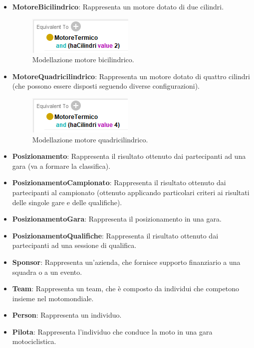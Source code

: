 \begin{itemize}
  \item \textbf{MotoreBicilindrico}: Rappresenta un motore dotato di due cilindri.
  \begin{figure}[H]
    \begin{center}
        \includegraphics[scale=1]{img/spec_bicilindrico.png}
       \caption{Modellazione motore bicilindrico.} 
    \end{center}
\end{figure}
  \item \textbf{MotoreQuadricilindrico}: Rappresenta un motore dotato di quattro cilindri (che possono essere disposti seguendo diverse configurazioni).
    \begin{figure}[H]
    \begin{center}
        \includegraphics[scale=1]{img/spec_quadricilindrico.png}
       \caption{Modellazione motore quadricilindrico.} 
    \end{center}
\end{figure}
  \item \textbf{Posizionamento}: Rappresenta il risultato ottenuto dai partecipanti ad una gara (va a formare la classifica).
  \item \textbf{PosizionamentoCampionato}: Rappresenta il risultato ottenuto dai partecipanti al campionato (ottenuto applicando particolari criteri ai risultati delle singole gare e delle qualifiche).
  \item \textbf{PosizionamentoGara}: Rappresenta il posizionamento in una gara.
  \item \textbf{PosizionamentoQualifiche}: Rappresenta il risultato ottenuto dai partecipanti ad una sessione di qualifica.
  \item \textbf{Sponsor}: Rappresenta un'azienda, che fornisce supporto finanziario a una squadra o a un evento.
  \item \textbf{Team}: Rappresenta un team, che è composto da individui che competono insieme nel motomondiale.
  \item \textbf{Person}: Rappresenta un individuo.
  \item \textbf{Pilota}: Rappresenta l'individuo che conduce la moto in una gara motociclistica.

\end{itemize}
